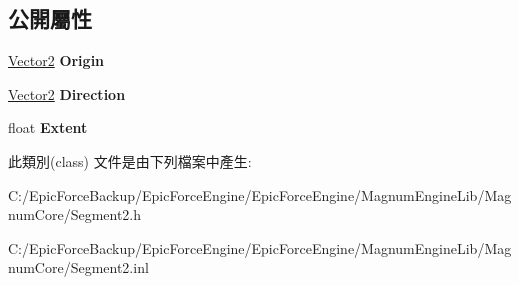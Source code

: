 \subsection*{公開屬性}
\begin{DoxyCompactItemize}
\item 
\hyperlink{class_magnum_1_1_vector2}{Vector2} {\bfseries Origin}\hypertarget{class_magnum_1_1_segment2_affed3725d56e3676f53e40c7271c4132}{}\label{class_magnum_1_1_segment2_affed3725d56e3676f53e40c7271c4132}

\item 
\hyperlink{class_magnum_1_1_vector2}{Vector2} {\bfseries Direction}\hypertarget{class_magnum_1_1_segment2_a34aebd28e5f02de06b6af78168c92d3a}{}\label{class_magnum_1_1_segment2_a34aebd28e5f02de06b6af78168c92d3a}

\item 
float {\bfseries Extent}\hypertarget{class_magnum_1_1_segment2_a8083bea1068428cbc1f318fd3b11c8bd}{}\label{class_magnum_1_1_segment2_a8083bea1068428cbc1f318fd3b11c8bd}

\end{DoxyCompactItemize}


此類別(class) 文件是由下列檔案中產生\+:\begin{DoxyCompactItemize}
\item 
C\+:/\+Epic\+Force\+Backup/\+Epic\+Force\+Engine/\+Epic\+Force\+Engine/\+Magnum\+Engine\+Lib/\+Magnum\+Core/Segment2.\+h\item 
C\+:/\+Epic\+Force\+Backup/\+Epic\+Force\+Engine/\+Epic\+Force\+Engine/\+Magnum\+Engine\+Lib/\+Magnum\+Core/Segment2.\+inl\end{DoxyCompactItemize}
